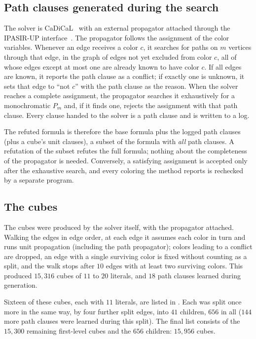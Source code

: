 \subsection{Path clauses generated during the search}\label{sec:prop}
The solver is CaDiCaL~\cite{BFF+24} with an external propagator attached
through the IPASIR-UP interface~\cite{FNP+23,FNP+24}. The propagator
follows the assignment of the color variables. Whenever an edge receives a
color $c$, it searches for paths on $m$ vertices through that edge, in the
graph of edges not yet excluded from color $c$, all of whose edges except
at most one are already known to have color $c$. If all edges are known,
it reports the path clause as a conflict; if exactly one is unknown, it
sets that edge to ``not $c$'' with the path clause as the reason. When the
solver reaches a complete assignment, the propagator searches it
exhaustively for a monochromatic $P_m$ and, if it finds one, rejects the
assignment with that path clause. Every clause handed to the solver is a
path clause and is written to a log.

The refuted formula is therefore the base formula plus the logged path
clauses (plus a cube's unit clauses), a subset of the formula with
\emph{all} path clauses. A refutation of the subset refutes the full
formula; nothing about the completeness of the propagator is needed.
Conversely, a satisfying assignment is accepted only after the exhaustive
search, and every coloring the method reports is rechecked by a separate
program.




\subsection{The cubes}
The
cubes were produced by the solver itself, with the propagator attached.
Walking the edges in edge order, at each edge it assumes each color in
turn and runs unit propagation (including the path propagator); colors
leading to a conflict are dropped, an edge with a single surviving color
is fixed without counting as a split, and the walk stops after $10$ edges
with at least two surviving colors. This produced $15{,}316$ cubes of
$11$ to $20$ literals, and $18$ path clauses learned during generation.

Sixteen of these cubes, each with $11$ literals, are listed in
. Each was split once more in the same way, by four further split
edges, into $41$ children, $656$ in all ($144$ more path clauses were
learned during this split). The final list consists of the $15{,}300$
remaining first-level cubes and the $656$ children: $15{,}956$ cubes.

